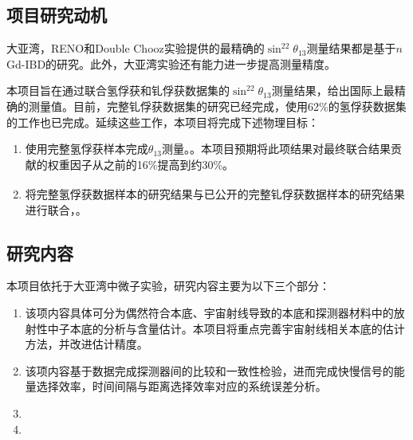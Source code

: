 \documentclass[a4paper,zihao=-4]{article}
\newcommand{\citess}[1]{\textsuperscript{\cite{#1}}}
\begin{document}
\subsection{项目研究动机}
大亚湾，RENO和Double Chooz实验提供的最精确的$\sin^22\theta_{13}$测量结果都是基于$n$Gd-IBD的研究。此外，大亚湾实验还有能力进一步提高测量精度。

本项目旨在通过联合氢俘获和钆俘获数据集的$\sin^22\theta_{13}$测量结果，给出国际上最精确的测量值。目前，完整钆俘获数据集的研究已经完成，使用62\%的氢俘获数据集的工作也已完成。延续这些工作，本项目将完成下述物理目标：
\begin{enumerate}
	\item 使用完整氢俘获样本完成$\theta_{13}$测量。。本项目预期将此项结果对最终联合结果贡献的权重因子从之前的16\%提高到约30\%。
	\item 将完整氢俘获数据样本的研究结果与已公开的完整钆俘获数据样本的研究结果\citess{DayaBay:2022orm}进行联合，。
\end{enumerate}

\begin{spacing}{1.3} %
	 \songti   
	
	  
	\vspace{11bp}
\end{spacing}

\subsection{研究内容}

本项目依托于大亚湾中微子实验，研究内容主要为以下三个部分：
\begin{enumerate}
	\item {}该项内容具体可分为偶然符合本底、宇宙射线导致的本底和探测器材料中的放射性中子本底的分析与含量估计。本项目将重点完善宇宙射线相关本底的估计方法，并改进估计精度。
	\item {}该项内容基于数据完成探测器间的比较和一致性检验，进而完成快慢信号的能量选择效率，时间间隔与距离选择效率对应的系统误差分析。
	\item {}
	\item {}
\end{enumerate}
\end{document}
